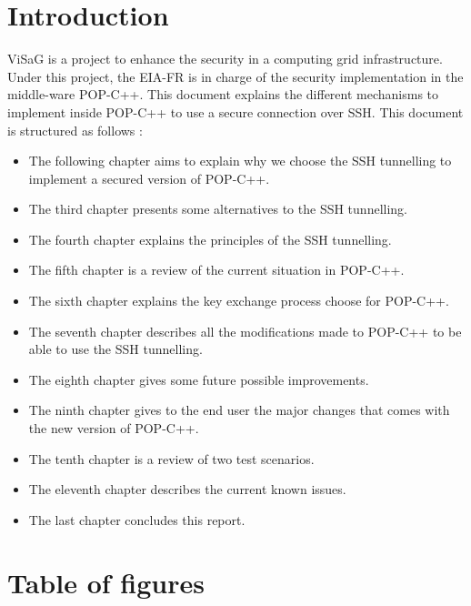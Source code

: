 \documentclass[a4paper, 11pt]{article}
\begin{document}




\tableofcontents
\pagebreak
\section{Introduction}
ViSaG is a project to enhance the security in a computing grid infrastructure. Under this project, the EIA-FR is in charge of the security implementation in the middle-ware POP-C++. This document explains the different mechanisms to implement inside POP-C++ to use a secure connection over SSH. This document is structured as follows : 
\begin{itemize}
\item The following chapter aims to explain why we choose the SSH tunnelling to implement a secured version of POP-C++.
\item The third chapter presents some alternatives to the SSH tunnelling.
\item The fourth chapter explains the principles of the SSH tunnelling.
\item The fifth chapter is a review of the current situation in POP-C++.
\item The sixth chapter explains the key exchange process choose for POP-C++.
\item The seventh chapter describes all the modifications made to POP-C++ to be able to use the SSH tunnelling.
\item The eighth chapter gives some future possible improvements. 
\item The ninth chapter gives to the end user the major changes that comes with the new version of POP-C++.
\item The tenth chapter is a review of two test scenarios. 
\item The eleventh chapter describes the current known issues. 
\item The last chapter concludes this report. 
\end{itemize}





\pagebreak



\pagebreak





\section{Table of figures}
\listoffigures{}
\end{document}
